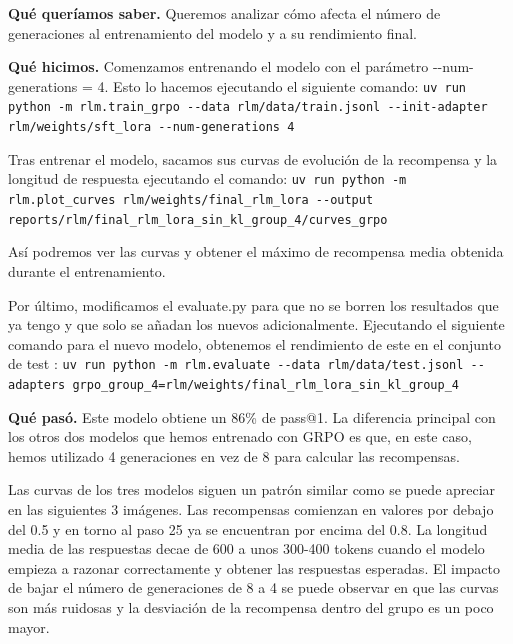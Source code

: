\textbf{Qué queríamos saber.} Queremos analizar cómo afecta el número de generaciones al entrenamiento del modelo y a su rendimiento final.

\textbf{Qué hicimos.} Comenzamos entrenando el modelo con el parámetro -\/-num-generations = 4. Esto lo hacemos ejecutando el siguiente comando:
\texttt{uv run python -m rlm.train\_\allowbreak{}grpo -\/\allowbreak{}-data rlm/\allowbreak{}data/\allowbreak{}train.jsonl -\/\allowbreak{}-init-adapter rlm/\allowbreak{}weights/\allowbreak{}sft\_\allowbreak{}lora -\/\allowbreak{}-num-generations 4}

Tras entrenar el modelo, sacamos sus curvas de evolución de la recompensa y la longitud de respuesta ejecutando el comando:
\texttt{uv run python -m rlm.plot\_\allowbreak{}curves rlm/\allowbreak{}weights/\allowbreak{}final\_\allowbreak{}rlm\_\allowbreak{}lora -\/\allowbreak{}-output reports/\allowbreak{}rlm/\allowbreak{}final\_\allowbreak{}rlm\_\allowbreak{}lora\_\allowbreak{}sin\_\allowbreak{}kl\_\allowbreak{}group\_\allowbreak{}4/\allowbreak{}curves\_\allowbreak{}grpo}

Así podremos ver las curvas y obtener el máximo de recompensa media obtenida durante el entrenamiento.

Por último, modificamos el evaluate.py para que no se borren los resultados que ya tengo y que solo se añadan los nuevos adicionalmente. Ejecutando el siguiente comando para el nuevo modelo, obtenemos el rendimiento de este en el conjunto de test :
\texttt{uv run python -m rlm.evaluate -\/\allowbreak{}-data rlm/\allowbreak{}data/\allowbreak{}test.jsonl -\/\allowbreak{}-adapters grpo\_\allowbreak{}group\_\allowbreak{}4=\allowbreak{}rlm/\allowbreak{}weights/\allowbreak{}final\_\allowbreak{}rlm\_\allowbreak{}lora\_\allowbreak{}sin\_\allowbreak{}kl\_\allowbreak{}group\_\allowbreak{}4}

\textbf{Qué pasó.} Este modelo obtiene un 86\% de pass@1. La diferencia principal con los otros dos modelos que hemos entrenado con GRPO es que, en este caso, hemos utilizado 4 generaciones en vez de 8 para calcular las recompensas.

Las curvas de los tres modelos siguen un patrón similar como se puede apreciar en las siguientes 3 imágenes. Las recompensas comienzan en valores por debajo del 0.5 y en torno al paso 25 ya se encuentran por encima del 0.8. La longitud media de las respuestas decae de 600 a unos 300-400 tokens cuando el modelo empieza a razonar correctamente y obtener las respuestas esperadas. El impacto de bajar el número de generaciones de 8 a 4 se puede observar en que las curvas son más ruidosas y la desviación de la recompensa dentro del grupo es un poco mayor.

